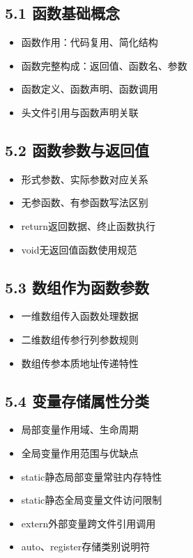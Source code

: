 \subsection*{5.1 函数基础概念}
\begin{itemize}
\item 函数作用：代码复用、简化结构
\item 函数完整构成：返回值、函数名、参数
\item 函数定义、函数声明、函数调用
\item 头文件引用与函数声明关联
\end{itemize}

\subsection*{5.2 函数参数与返回值}
\begin{itemize}
\item 形式参数、实际参数对应关系
\item 无参函数、有参函数写法区别
\item return返回数据、终止函数执行
\item void无返回值函数使用规范
\end{itemize}

\subsection*{5.3 数组作为函数参数}
\begin{itemize}
\item 一维数组传入函数处理数据
\item 二维数组传参行列参数规则
\item 数组传参本质地址传递特性
\end{itemize}

\subsection*{5.4 变量存储属性分类}
\begin{itemize}
\item 局部变量作用域、生命周期
\item 全局变量作用范围与优缺点
\item static静态局部变量常驻内存特性
\item static静态全局变量文件访问限制
\item extern外部变量跨文件引用调用
\item auto、register存储类别说明符
\end{itemize}


